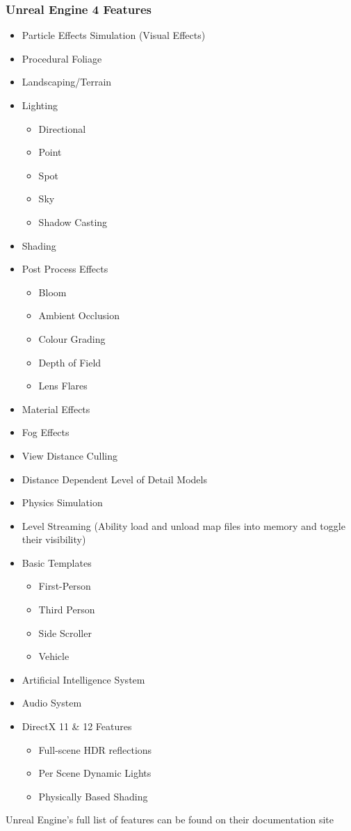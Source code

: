 \subsubsection{Unreal Engine 4 Features}
\begin{itemize}

	\item Particle Effects Simulation (Visual Effects)
	\item Procedural Foliage
	\item Landscaping/Terrain
	\item Lighting

	\begin{itemize}
		\item Directional
		\item Point
		\item Spot
		\item Sky
		\item Shadow Casting
	\end{itemize}

	\item Shading
	\item Post Process Effects

	\begin{itemize}
		\item Bloom
		\item Ambient Occlusion
		\item Colour Grading
		\item Depth of Field
		\item Lens Flares
	\end{itemize}

	\item Material Effects
	\item Fog Effects
	\item View Distance Culling
	\item Distance Dependent Level of Detail Models
	\item Physics Simulation
	\item Level Streaming (Ability load and unload map files into memory and toggle their visibility)
	\item Basic Templates

	\begin{itemize}
		\item First-Person
		\item Third Person
		\item Side Scroller
		\item Vehicle
	\end{itemize}

	\item Artificial Intelligence System
	\item Audio System
	\item DirectX 11 \& 12 Features

	\begin{itemize}
		\item Full-scene HDR reflections
		\item Per Scene Dynamic Lights
		\item Physically Based Shading
	\end{itemize}
\end{itemize}

Unreal Engine's full list of features can be found on their documentation site \cite{unrealfeaturelist}
